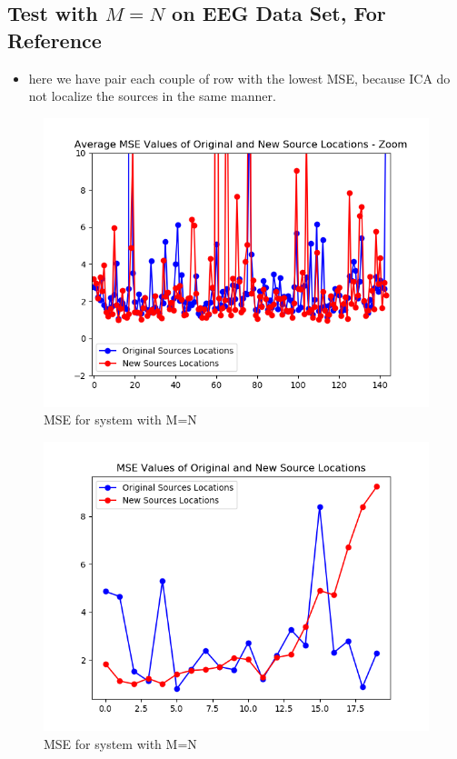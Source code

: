 





\subsection{Test with $M=N$ on EEG Data Set, For Reference}
\begin{itemize}
\item here we have pair each couple of row with the lowest MSE, because ICA do not localize the sources in the same manner.
\end{itemize}

\begin{figure}[H]
    \centering
	\includegraphics[scale=0.5]{figures/ch_7/M=N_1.png}
	\caption{MSE for system with M=N}
	\label{fig:M=N_1}
\end{figure}  

\begin{figure}[H]
    \centering
	\includegraphics[scale=0.5]{figures/ch_7/M=N_3.png}
	\caption{MSE for system with M=N}
	\label{fig:M=N_3}
\end{figure} 

